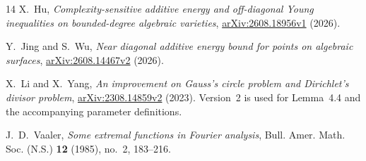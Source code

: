 \documentclass[11pt,reqno]{amsart}
\numberwithin{equation}{section}
\theoremstyle{definition}
\theoremstyle{remark}
\begin{document}
\begin{thebibliography}{14}
X.~Hu,
\emph{Complexity-sensitive additive energy and off-diagonal Young inequalities on bounded-degree algebraic varieties},
\href{https://arxiv.org/abs/2608.18956v1}{arXiv:2608.18956v1} (2026).

Y.~Jing and S.~Wu,
\emph{Near diagonal additive energy bound for points on algebraic surfaces},
\href{https://arxiv.org/abs/2608.14467v2}{arXiv:2608.14467v2} (2026).

X.~Li and X.~Yang,
\emph{An improvement on Gauss's circle problem and Dirichlet's divisor problem},
\href{https://arxiv.org/abs/2308.14859v2}{arXiv:2308.14859v2} (2023).
Version~2 is used for Lemma~4.4 and the accompanying parameter definitions.

J.~D.~Vaaler,
\emph{Some extremal functions in Fourier analysis},
Bull. Amer. Math. Soc. (N.S.) \textbf{12} (1985), no.~2, 183--216.

\end{thebibliography}
\end{document}

